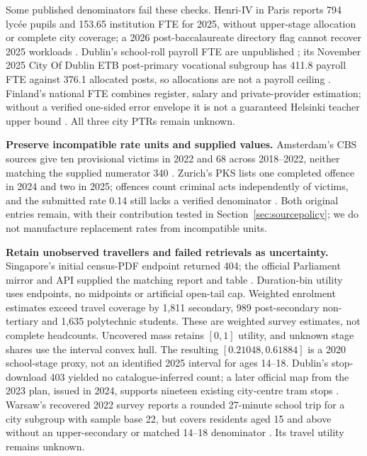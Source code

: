 Some published denominators fail these checks. Henri-IV in Paris reports
794 lyc\'ee pupils and 153.65 institution FTE for 2025, without upper-stage
allocation or complete city coverage; a 2026 post-baccalaureate directory flag cannot recover
2025 workloads \cite{deppmatch,deppdirectory}. Dublin's school-roll payroll
FTE are unpublished \cite{irelandfte}; its November 2025 City Of Dublin ETB
post-primary vocational subgroup has 411.8 payroll FTE against 376.1 allocated posts, so
allocations are not a payroll ceiling \cite{irelandpayroll}.
Finland's national FTE combines register, salary and private-provider estimation;
without a verified one-sided error envelope it is not a guaranteed Helsinki
teacher upper bound \cite{finlandfte}. All three city PTRs remain unknown.

\textbf{Preserve incompatible rate units and supplied values.}
Amsterdam's CBS sources give ten provisional victims in 2022 and 68 across
2018--2022, neither matching the supplied numerator 340 \cite{cbshomicide2022}.
Zurich's PKS lists one completed offence in 2024 and two in 2025; offences
count criminal acts independently of victims, and the submitted rate 0.14
still lacks a verified denominator \cite{zhpks2025}. Both original entries
remain, with their contribution tested in Section~\ref{sec:sourcepolicy};
we do not manufacture replacement rates from incompatible units.

\textbf{Retain unobserved travellers and failed retrievals as uncertainty.}
Singapore's initial census-PDF endpoint returned 404; the official Parliament
mirror and API supplied the matching report and table \cite{singapore}.
Duration-bin utility uses endpoints, no midpoints or artificial open-tail cap.
Weighted enrolment estimates exceed travel coverage by 1,811 secondary,
989 post-secondary non-tertiary and 1,635 polytechnic students. These are
weighted survey estimates, not complete headcounts. Uncovered mass
retains $[0,1]$ utility, and unknown stage shares use the interval convex hull.
The resulting $[0.21048,0.61884]$ is a 2020 school-stage proxy, not an identified
2025 interval for ages 14--18.
Dublin's stop-download 403 yielded no catalogue-inferred count; a later official
map from the 2023 plan, issued in 2024, supports nineteen existing
city-centre tram stops \cite{dublin}.
Warsaw's recovered 2022 survey reports a rounded 27-minute school trip for a
city subgroup with sample base 22, but covers residents aged 15 and above
without an upper-secondary or matched 14--18 denominator \cite{warsaw2022}.
Its travel utility remains unknown.

